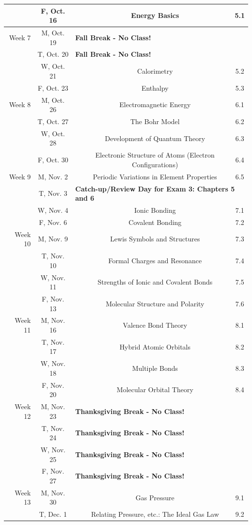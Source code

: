 \begin{tabular}{rcccc}
& F, Oct. 16&& Energy Basics & 5.1\\
\midrule
Week 7 & M, Oct. 19& \multicolumn{3}{l}{\textbf{Fall Break - No Class!}}\\
& T, Oct. 20& \multicolumn{3}{l}{\textbf{Fall Break - No Class!}}\\
& W, Oct. 21&& Calorimetry & 5.2\\
& F, Oct. 23&& Enthalpy & 5.3\\
\midrule
Week 8 & M, Oct. 26&& Electromagnetic Energy & 6.1\\
& T, Oct. 27&& The Bohr Model & 6.2\\
& W, Oct. 28&& Development of Quantum Theory & 6.3\\
& F, Oct. 30&& Electronic Structure of Atoms (Electron Configurations) & 6.4\\
\midrule
Week 9 & M, Nov. 2&& Periodic Variations in Element Properties & 6.5\\
& T, Nov. 3& \multicolumn{3}{l}{\textbf{Catch-up/Review Day for Exam 3: Chapters 5 and 6}}\\
& W, Nov. 4&& Ionic Bonding & 7.1\\
& F, Nov. 6&& Covalent Bonding & 7.2\\
\midrule
Week 10 & M, Nov. 9&& Lewis Symbols and Structures & 7.3\\
& T, Nov. 10&& Formal Charges and Resonance & 7.4\\
& W, Nov. 11&& Strengths of Ionic and Covalent Bonds & 7.5\\
& F, Nov. 13&& Molecular Structure and Polarity & 7.6\\
\midrule
Week 11 & M, Nov. 16&& Valence Bond Theory & 8.1\\
& T, Nov. 17&& Hybrid Atomic Orbitals & 8.2\\
& W, Nov. 18&& Multiple Bonds & 8.3\\
& F, Nov. 20&& Molecular Orbital Theory & 8.4\\
\midrule
Week 12 & M, Nov. 23& \multicolumn{3}{l}{\textbf{Thanksgiving Break - No Class!}}\\
& T, Nov. 24& \multicolumn{3}{l}{\textbf{Thanksgiving Break - No Class!}}\\
& W, Nov. 25& \multicolumn{3}{l}{\textbf{Thanksgiving Break - No Class!}}\\
& F, Nov. 27& \multicolumn{3}{l}{\textbf{Thanksgiving Break - No Class!}}\\
\midrule
Week 13 & M, Nov. 30&& Gas Pressure & 9.1\\
& T, Dec. 1&& Relating Pressure, etc.: The Ideal Gas Law & 9.2\\

\end{tabular}
